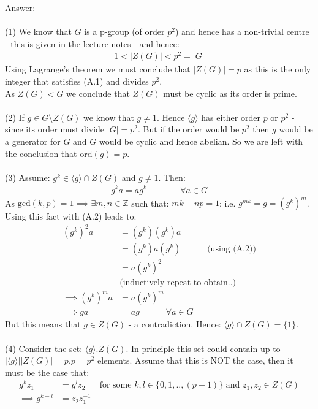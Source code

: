 \documentclass[12pt,a4paper]{article}
\begin{document}
\vspace{1cm}
\noindent
Answer:\\
\\
(1) We know that $G$ is a p-group (of order $p^2$) and hence has a non-trivial centre - this is given in the lecture notes - and
hence:
\begin{align*}
    1 < |Z(G)| < p^2 = |G| \tag{A.1}
\end{align*}
Using Lagrange's theorem we must conclude that $|Z(G)| = p$ as this is the only integer that satisfies (A.1) and divides $p^2$.\\
As $Z(G) < G$ we conclude that $Z(G)$ must be cyclic as its order is prime.\\
\\
(2) If $g \in G \setminus Z(G)$ we know that $g \ne 1$.  Hence $\langle g \rangle$ has either order $p$ or $p^2$ - since its order must divide $|G|=p^2$.  But if the order would be $p^2$ then $g$ would 
be a generator for $G$ and $G$ would be cyclic and hence abelian.  So we are left with the conclusion that $\text{ord}(g)=p$.\\
\\
(3) Assume: $g^k \in \langle g \rangle \cap Z(G)$ and $g \ne 1$.  Then:
\begin{align*}
    g^k a = a g^k \;\;\;\;\;\;\;\;\;\;\;\;\;\; \forall a \in G  \tag{A.2}
\end{align*}
As $\text{gcd}(k,p)=1 \implies \exists m,n \in \mathbb{Z}$ such that:
$mk + np=1$; i.e. $g^{mk} = g = (g^k)^m$. Using this fact with (A.2) leads to:
\begin{align*}
    (g^k)^2 a &= (g^k)(g^k) a \\
     &= (g^k) a (g^k) \;\;\;\;\;\;\;\;\;\;\; \text{(using (A.2))} \\
     &= a (g^k)^2  \\
     &\text{(inductively repeat to obtain..)} \\
    \implies  (g^k)^m a &= a (g^k)^m \\
    \implies  g a &= a g \;\;\;\;\;\;\;\;\;\;\; \forall a \in G
\end{align*}
But this means that $g \in Z(G)$ - a contradiction.  Hence: $\langle g \rangle \cap Z(G) = \{1\}$.\\
\\
(4) Consider the set: $\langle g \rangle . Z(G)$. In principle this set could contain up to $|\langle g \rangle| |Z(G)| = p.p=p^2$ elements.  Assume that this is NOT the case, then
it must be the case that:
\begin{align*}
    g^k z_1 &= g^l z_2 \;\;\;\;\;\; \text{for some } k,l \in \{0,1,..,(p-1)\} \text{ and } z_1,z_2 \in Z(G) \\
  \implies g^{k-l} &= z_2 z_1^{-1} \tag{A.3}
\end{align*}
\end{document}
